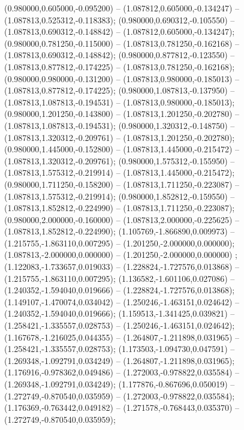  (0.980000,0.605000,-0.095200) -- (1.087812,0.605000,-0.134247) -- (1.087813,0.525312,-0.118383);
 (0.980000,0.690312,-0.105550) -- (1.087813,0.690312,-0.148842) -- (1.087812,0.605000,-0.134247);
 (0.980000,0.781250,-0.115000) -- (1.087813,0.781250,-0.162168) -- (1.087813,0.690312,-0.148842);
 (0.980000,0.877812,-0.123550) -- (1.087813,0.877812,-0.174225) -- (1.087813,0.781250,-0.162168);
 (0.980000,0.980000,-0.131200) -- (1.087813,0.980000,-0.185013) -- (1.087813,0.877812,-0.174225);
 (0.980000,1.087813,-0.137950) -- (1.087813,1.087813,-0.194531) -- (1.087813,0.980000,-0.185013);
 (0.980000,1.201250,-0.143800) -- (1.087813,1.201250,-0.202780) -- (1.087813,1.087813,-0.194531);
 (0.980000,1.320312,-0.148750) -- (1.087813,1.320312,-0.209761) -- (1.087813,1.201250,-0.202780);
 (0.980000,1.445000,-0.152800) -- (1.087813,1.445000,-0.215472) -- (1.087813,1.320312,-0.209761);
 (0.980000,1.575312,-0.155950) -- (1.087813,1.575312,-0.219914) -- (1.087813,1.445000,-0.215472);
 (0.980000,1.711250,-0.158200) -- (1.087813,1.711250,-0.223087) -- (1.087813,1.575312,-0.219914);
 (0.980000,1.852812,-0.159550) -- (1.087813,1.852812,-0.224990) -- (1.087813,1.711250,-0.223087);
 (0.980000,2.000000,-0.160000) -- (1.087813,2.000000,-0.225625) -- (1.087813,1.852812,-0.224990);
 (1.105769,-1.866890,0.009973) -- (1.215755,-1.863110,0.007295) -- (1.201250,-2.000000,0.000000);
 (1.087813,-2.000000,0.000000) -- (1.201250,-2.000000,0.000000) ;
 (1.122083,-1.733657,0.019033) -- (1.228824,-1.727576,0.013868) -- (1.215755,-1.863110,0.007295);
 (1.136582,-1.601106,0.027086) -- (1.240352,-1.594040,0.019666) -- (1.228824,-1.727576,0.013868);
 (1.149107,-1.470074,0.034042) -- (1.250246,-1.463151,0.024642) -- (1.240352,-1.594040,0.019666);
 (1.159513,-1.341425,0.039821) -- (1.258421,-1.335557,0.028753) -- (1.250246,-1.463151,0.024642);
 (1.167678,-1.216025,0.044355) -- (1.264807,-1.211898,0.031965) -- (1.258421,-1.335557,0.028753);
 (1.173503,-1.094730,0.047591) -- (1.269348,-1.092791,0.034249) -- (1.264807,-1.211898,0.031965);
 (1.176916,-0.978362,0.049486) -- (1.272003,-0.978822,0.035584) -- (1.269348,-1.092791,0.034249);
 (1.177876,-0.867696,0.050019) -- (1.272749,-0.870540,0.035959) -- (1.272003,-0.978822,0.035584);
 (1.176369,-0.763442,0.049182) -- (1.271578,-0.768443,0.035370) -- (1.272749,-0.870540,0.035959);
